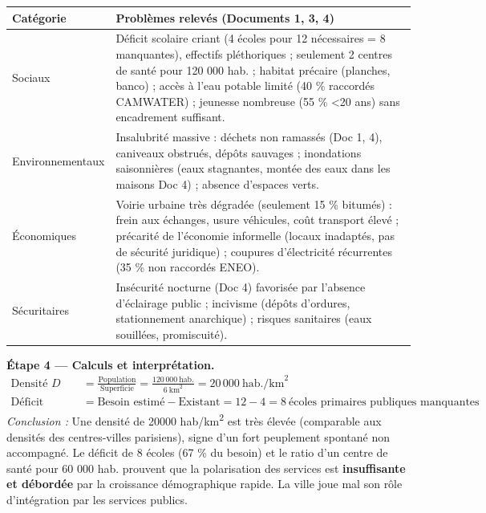 \documentclass[11pt]{article}
\newcommand{\cle}[1]{{\popxbold\color{popdark}#1}}
\begin{document}
\begin{exoresolu}
\begin{center}
\begin{tabularx}{\linewidth}{|l|X|}\hline
\rowcolor{popblueL} \textbf{Catégorie} & \textbf{Problèmes relevés (Documents 1, 3, 4)} \\ \hline
\cle{Sociaux} & Déficit scolaire criant (4 écoles pour 12 nécessaires = 8 manquantes), effectifs pléthoriques ; seulement 2 centres de santé pour 120 000 hab. ; habitat précaire (planches, banco) ; accès à l'eau potable limité (40 \% raccordés CAMWATER) ; jeunesse nombreuse (55 \% \textless 20 ans) sans encadrement suffisant. \\ \hline
\cle{Environnementaux} & \cle{Insalubrité} massive : déchets non ramassés (Doc 1, 4), caniveaux obstrués, dépôts sauvages ; \cle{inondations} saisonnières (eaux stagnantes, montée des eaux dans les maisons Doc 4) ; absence d'espaces verts. \\ \hline
\cle{Économiques} & \cle{Voirie urbaine} très dégradée (seulement 15 \% bitumés) : frein aux échanges, usure véhicules, coût transport élevé ; précarité de l'économie informelle (locaux inadaptés, pas de sécurité juridique) ; coupures d'électricité récurrentes (35 \% non raccordés ENEO). \\ \hline
\cle{Sécuritaires} & \cle{Insécurité} nocturne (Doc 4) favorisée par l'absence d'éclairage public ; incivisme (dépôts d'ordures, stationnement anarchique) ; risques sanitaires (eaux souillées, promiscuité). \\ \hline
\end{tabularx}
\end{center}

\textbf{Étape 4 — Calculs et interprétation.}
\begin{align*}
\text{Densité } D &= \frac{\text{Population}}{\text{Superficie}} = \frac{120\,000\ \text{hab.}}{6\ \text{km}^2} = 20\,000\ \text{hab./km}^2 \\[0.5em]
\text{Déficit scolaire} &= \text{Besoin estimé} - \text{Existant} = 12 - 4 = 8\ \text{écoles primaires publiques manquantes}
\end{align*}
\emph{Conclusion :} Une densité de \num{20000} hab/km\textsuperscript{2} est très élevée (comparable aux densités des centres-villes parisiens), signe d'un fort peuplement spontané non accompagné. Le déficit de 8 écoles (67 \% du besoin) et le ratio d'un centre de santé pour 60 000 hab. prouvent que la \cle{polarisation des services} est \textbf{insuffisante et débordée} par la croissance démographique rapide. La ville joue mal son rôle d'intégration par les services publics.


\end{exoresolu}
\end{document}
